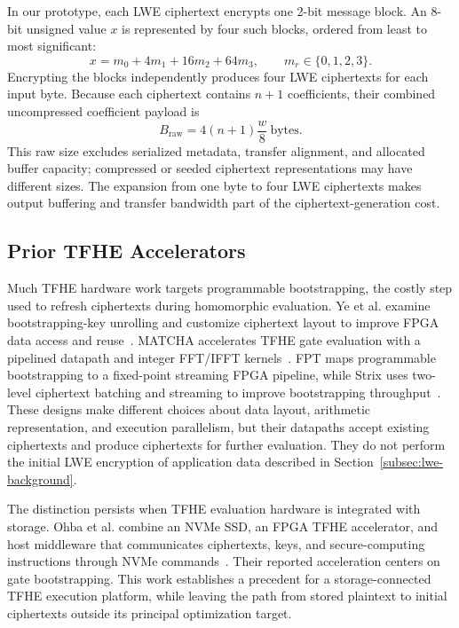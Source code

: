 In our prototype, each LWE ciphertext encrypts one 2-bit message block. An 8-bit unsigned value $x$ is represented by four such blocks, ordered from least to most significant:
\begin{equation}
x=m_0+4m_1+16m_2+64m_3,
\qquad m_r\in\{0,1,2,3\}.
\label{eq:radix-representation}
\end{equation}
Encrypting the blocks independently produces four LWE ciphertexts for each input byte. Because each ciphertext contains $n+1$ coefficients, their combined uncompressed coefficient payload is
\begin{equation}
B_{\mathrm{raw}}=4(n+1)\frac{w}{8}\ \text{bytes}.
\label{eq:radix-cipher-size}
\end{equation}
This raw size excludes serialized metadata, transfer alignment, and allocated buffer capacity; compressed or seeded ciphertext representations may have different sizes. The expansion from one byte to four LWE ciphertexts makes output buffering and transfer bandwidth part of the ciphertext-generation cost.

\subsection{Prior TFHE Accelerators}
\label{subsec:tfhe-acceleration-background}

Much TFHE hardware work targets programmable bootstrapping, the costly step used to refresh ciphertexts during homomorphic evaluation. Ye et al. examine bootstrapping-key unrolling and customize ciphertext layout to improve FPGA data access and reuse~\cite{ye-tfhe-fpga}. MATCHA accelerates TFHE gate evaluation with a pipelined datapath and integer FFT/IFFT kernels~\cite{matcha}. FPT maps programmable bootstrapping to a fixed-point streaming FPGA pipeline, while Strix uses two-level ciphertext batching and streaming to improve bootstrapping throughput~\cite{fpt,strix}. These designs make different choices about data layout, arithmetic representation, and execution parallelism, but their datapaths accept existing ciphertexts and produce ciphertexts for further evaluation. They do not perform the initial LWE encryption of application data described in Section~\ref{subsec:lwe-background}.

The distinction persists when TFHE evaluation hardware is integrated with storage. Ohba et al. combine an NVMe SSD, an FPGA TFHE accelerator, and host middleware that communicates ciphertexts, keys, and secure-computing instructions through NVMe commands~\cite{ohba-nvme-tfhe}. Their reported acceleration centers on gate bootstrapping. This work establishes a precedent for a storage-connected TFHE execution platform, while leaving the path from stored plaintext to initial ciphertexts outside its principal optimization target.

